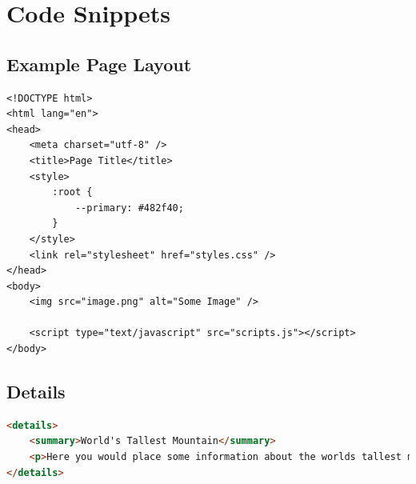 \documentclass[12pt, a4paper]{article}
\begin{document}
	\section{Code Snippets}

	\subsection{Example Page Layout}
	\begin{lstlisting}
<!DOCTYPE html>
<html lang="en">
<head>
	<meta charset="utf-8" />
	<title>Page Title</title>
	<style>
		:root {
			--primary: #482f40;
		}
	</style>
	<link rel="stylesheet" href="styles.css" />
</head>
<body>
	<img src="image.png" alt="Some Image" />

	<script type="text/javascript" src="scripts.js"></script>
</body>	
	\end{lstlisting}
	

	\subsection{Details}
	\begin{lstlisting}[language=html]
<details>
	<summary>World's Tallest Mountain</summary>
	<p>Here you would place some information about the worlds tallest moon</p>
</details>
	\end{lstlisting}
\end{document}
